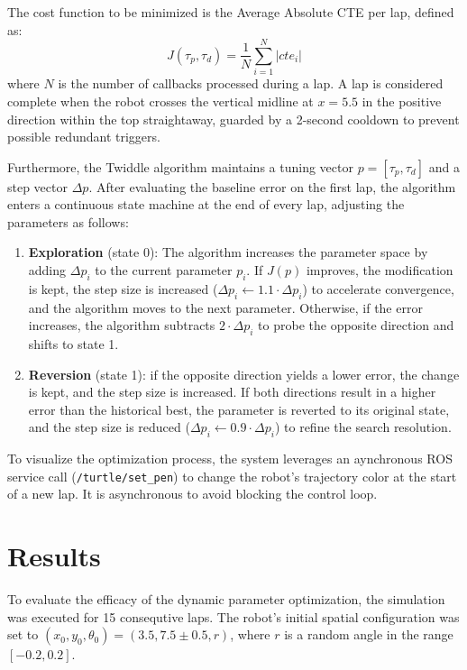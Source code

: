 \documentclass[12pt]{article}
\begin{document}
The cost function to be minimized is the Average Absolute CTE per lap, defined as:
\begin{equation}
    J(\tau_p, \tau_d) = \frac{1}{N} \sum_{i=1}^{N} |cte_i|
\end{equation}
where $N$ is the number of callbacks processed during a lap. A lap is considered complete when the
robot crosses the vertical midline at $x = 5.5$ in the positive direction within the top straightaway,
guarded by a 2-second cooldown to prevent possible redundant triggers.

Furthermore, the Twiddle algorithm maintains a tuning vector $p = [\tau_p, \tau_d]$ and a step
vector $\Delta p$. After evaluating the baseline error on the first lap, the algorithm enters a
continuous state machine at the end of every lap, adjusting the parameters as follows:
\begin{enumerate}
    \item \textbf{Exploration} (state 0): The algorithm increases the parameter space by adding
          $\Delta p_i$ to the current parameter $p_i$. If $J(p)$ improves, the modification is kept,
          the step size is increased ($\Delta p_i \leftarrow 1.1 \cdot \Delta p_i$) to accelerate
          convergence, and the algorithm moves to the next parameter. Otherwise, if the error
          increases, the algorithm subtracts $2 \cdot \Delta p_i$ to probe the opposite direction
          and shifts to state 1.
    \item \textbf{Reversion} (state 1): if the opposite direction yields a lower error, the change
          is kept, and the step size is increased. If both directions result in a higher error than
          the historical best, the parameter is reverted to its original state, and the step size is
          reduced ($\Delta p_i \leftarrow 0.9 \cdot \Delta p_i$) to refine the search resolution.
\end{enumerate}

To visualize the optimization process, the system leverages an aynchronous ROS service call
(\texttt{/turtle/set\_pen}) to change the robot's trajectory color at the start of a new lap. It
is asynchronous to avoid blocking the control loop.


\section{Results}

To evaluate the efficacy of the dynamic parameter optimization, the simulation was executed for 15
consequtive laps. The robot's initial spatial configuration was set to
$(x_0, y_0, \theta_0) = (3.5, 7.5 \pm 0.5, r)$, where $r$ is a random angle in the range $[-0.2, 0.2]$.
\end{document}
